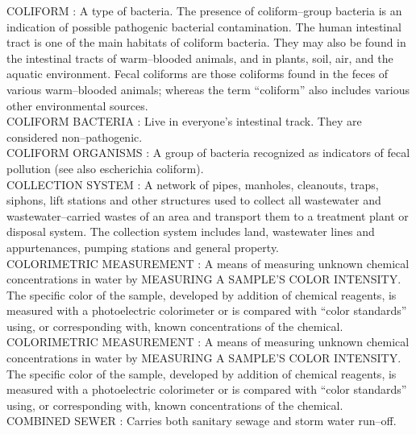 \vspace{0.15cm}
COLIFORM :  A type of bacteria. The presence of coliform–group bacteria is an indication of possible pathogenic bacterial contamination. The human intestinal tract is one of the main habitats of coliform bacteria. They may also be found in the intestinal tracts of warm–blooded animals, and in plants, soil, air, and the aquatic environment. Fecal coliforms are those coliforms found in the feces of various warm–blooded animals; whereas the term “coliform” also includes various other environmental sources.\\
\vspace{0.15cm}
COLIFORM BACTERIA :  Live in everyone’s intestinal track. They are considered non–pathogenic. \\
\vspace{0.15cm}
COLIFORM ORGANISMS :   A group of bacteria recognized as indicators of fecal pollution (see also escherichia coliform).\\
\vspace{0.15cm}
COLLECTION SYSTEM :  A network of pipes, manholes, cleanouts, traps, siphons, lift stations and other structures used to collect all wastewater and wastewater–carried wastes of an area and transport them to a treatment plant or disposal system. The collection system includes land, wastewater lines and appurtenances, pumping stations and general property. \\
\vspace{0.15cm}
COLORIMETRIC MEASUREMENT :  A means of measuring unknown chemical concentrations in water by MEASURING A SAMPLE’S COLOR INTENSITY. The specific color of the sample, developed by addition of chemical reagents, is measured with a photoelectric colorimeter or is compared with “color standards” using, or corresponding with, known concentrations of the chemical.\\
\vspace{0.15cm}
COLORIMETRIC MEASUREMENT :  A means of measuring unknown chemical concentrations in water by MEASURING A SAMPLE’S COLOR INTENSITY. The specific color of the sample, developed by addition of chemical reagents, is measured with a photoelectric colorimeter or is compared with “color standards” using, or corresponding with, known concentrations of the chemical.\\
\vspace{0.15cm}
COMBINED SEWER :   Carries both sanitary sewage and storm water run–off.\\
\vspace{0.15cm}
